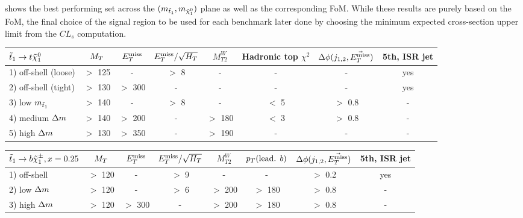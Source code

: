      shows the best performing set across the
    $(m_{\tilde{t}_1},m_{\tilde{\chi}_1^0})$ plane as well as the corresponding FoM. While
    these results are purely based on the FoM, the final choice of the signal region to
    be used for each benchmark later done by choosing the minimum expected cross-section
    upper limit from the $CL_s$ computation.

\begin{table}[!ht]
{\footnotesize
\begin{center}
\hspace*{-0.8cm}
    \begin{tabular}{|l|ccccccc|}
    \hline
    $\tilde{t}_1 \rightarrow t\tilde{\chi}_1^0$ & $M_T$   & $E_T^\text{miss}$    & $E_T^\text{miss}/\sqrt{H_T}$  & $M_{T2}^W$ & Hadronic top $\chi^2$ & $\Delta\phi(j_{1,2},\vec{E_T^\text{miss}})$      &   5th, ISR jet \\
    \hline
    1) off-shell (loose)       & $>$ 125 & -       &   $>$ 8            &     -     & -             &          - &    yes        \\
    2) off-shell (tight)       & $>$ 130 & $>$ 300 &   -                &     -     & -        	    &          - &    yes        \\
    3) low    $m_{\tilde{t}_1}$  & $>$ 140 & -       &   $>$ 8            &     -     &  $<$ 5        &  $>$ 0.8   &    -          \\
    4) medium $\Delta m$        & $>$ 140 & $>$ 200 &   -                &  $>$ 180  &  $<$ 3        &  $>$ 0.8   &    -          \\
    5) high   $\Delta m$        & $>$ 130 & $>$ 350 &   -                &  $>$ 190  & -             &          - &    -          \\
        \hline
    \end{tabular}
    \hspace*{-0.5cm}
    \begin{tabular}{|l|ccccccc|}
    \hline
    $\tilde{t}_1 \rightarrow b\tilde{\chi}_1^\pm, x=0.25$   & $M_T$     & $E_T^\text{miss}$    & $E_T^\text{miss}/\sqrt{H_T}$ & $M_{T2}^W$ & $p_T(\text{lead. }b)$ & $\Delta\phi(j_{1,2},\vec{E_T^\text{miss}})$ & 5th, ISR jet  \\
    \hline
    1) off-shell        & $>$ 120   &  -       &    $>$  9       &     -      &   -                   &  $>$ 0.2      & yes           \\
    2) low    $\Delta m$ & $>$ 120   &  -       &    $>$  6       &  $>$ 200   & $>$ 180               &  $>$ 0.8      & -             \\
    3) high   $\Delta m$ & $>$ 120   & $>$ 300  &     -           &  $>$ 200   & $>$ 180               &  $>$ 0.8      & -             \\

\end{tabular}
\end{center}}
\end{table}
